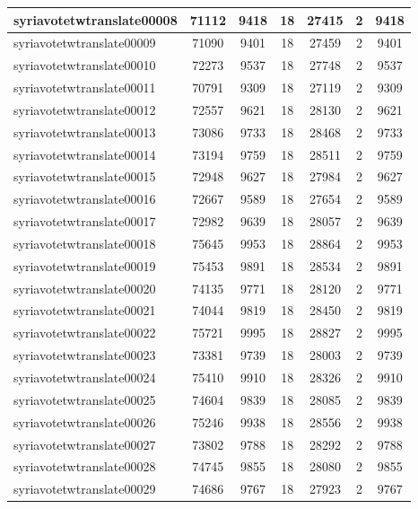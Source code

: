 \begin{table*}[h!]
\begin{center}
\begin{tabular}{| l | c | c | c | c | c | c |}
syriavotetwtranslate00008 & 71112  & 9418  & 18  & 27415  & 2  & 9418 \\\hline
syriavotetwtranslate00009 & 71090  & 9401  & 18  & 27459  & 2  & 9401 \\\hline
syriavotetwtranslate00010 & 72273  & 9537  & 18  & 27748  & 2  & 9537 \\\hline
syriavotetwtranslate00011 & 70791  & 9309  & 18  & 27119  & 2  & 9309 \\\hline
syriavotetwtranslate00012 & 72557  & 9621  & 18  & 28130  & 2  & 9621 \\\hline
syriavotetwtranslate00013 & 73086  & 9733  & 18  & 28468  & 2  & 9733 \\\hline
syriavotetwtranslate00014 & 73194  & 9759  & 18  & 28511  & 2  & 9759 \\\hline
syriavotetwtranslate00015 & 72948  & 9627  & 18  & 27984  & 2  & 9627 \\\hline
syriavotetwtranslate00016 & 72667  & 9589  & 18  & 27654  & 2  & 9589 \\\hline
syriavotetwtranslate00017 & 72982  & 9639  & 18  & 28057  & 2  & 9639 \\\hline
syriavotetwtranslate00018 & 75645  & 9953  & 18  & 28864  & 2  & 9953 \\\hline
syriavotetwtranslate00019 & 75453  & 9891  & 18  & 28534  & 2  & 9891 \\\hline
syriavotetwtranslate00020 & 74135  & 9771  & 18  & 28120  & 2  & 9771 \\\hline
syriavotetwtranslate00021 & 74044  & 9819  & 18  & 28450  & 2  & 9819 \\\hline
syriavotetwtranslate00022 & 75721  & 9995  & 18  & 28827  & 2  & 9995 \\\hline
syriavotetwtranslate00023 & 73381  & 9739  & 18  & 28003  & 2  & 9739 \\\hline
syriavotetwtranslate00024 & 75410  & 9910  & 18  & 28326  & 2  & 9910 \\\hline
syriavotetwtranslate00025 & 74604  & 9839  & 18  & 28085  & 2  & 9839 \\\hline
syriavotetwtranslate00026 & 75246  & 9938  & 18  & 28556  & 2  & 9938 \\\hline
syriavotetwtranslate00027 & 73802  & 9788  & 18  & 28292  & 2  & 9788 \\\hline
syriavotetwtranslate00028 & 74745  & 9855  & 18  & 28080  & 2  & 9855 \\\hline
syriavotetwtranslate00029 & 74686  & 9767  & 18  & 27923  & 2  & 9767 \\\hline

\end{tabular}
\end{center}
\end{table*}
